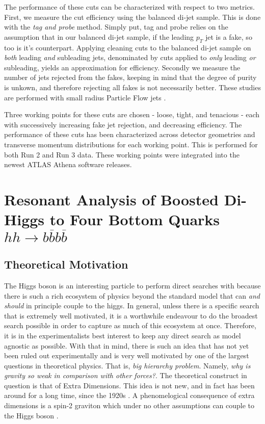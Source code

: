 \documentclass[12pt]{article}
\begin{document}
The performance of these cuts can be characterized with respect to two metrics.
First, we measure the cut efficiency using the balanced di-jet sample. This is
done with the \textit{tag and probe} method. Simply put, tag and probe relies on
the assumption that in our balanced di-jet sample, if the leading $p_T$ jet is a
fake, so too is it's counterpart. Applying cleaning cuts to the balanced di-jet
sample on \textit{both} leading \textit{and} subleading jets, denominated by
cuts applied to \textit{only} leading \textit{or} subleading, yields an
approximation for efficiency. Secondly we measure the number of jets rejected
from the fakes, keeping in mind that the degree of purity is unkown, and
therefore rejecting all fakes is not necessarily better. These studies are
performed with small radius Particle Flow jets \cite{pflow_jets}. 

Three working points for these cuts are chosen - loose, tight, and tenacious -
each with successively increasing fake jet rejection, and decreasing efficiency.
The performance of these cuts has been characterized across detector geometries
and transverse momentum distributions for each working point. This is performed
for both Run 2 and Run 3 data. These working points were integrated into the
newest ATLAS Athena software \cite{atlas_simulation} releases.

\section{Resonant Analysis of Boosted Di-Higgs to Four Bottom Quarks
$hh\rightarrow b\overline{b}b\overline{b}$}
\subsection{Theoretical Motivation}

The Higgs boson is an interesting particle to perform direct searches with
because there is such a rich ecosystem of physics beyond the standard model that
can \textit{and should} in principle couple to the higgs. In general, unless
there is a specific search that is extremely well motivated, it is a worthwhile
endeavour to do the broadest search possible in order to capture as much of this
ecosystem at once. Therefore, it is in the experimentalists best interest to
keep any direct search as model agnostic as possible. With that in mind, there
is such an idea that has not yet been ruled out experimentally and is very well
motivated by one of the largest questions in theoretical physics. That is,
\textit{big hierarchy problem}. Namely, \textit{why is gravity so weak in
comparison with other forces?}. The theoretical construct in question is that of
Extra Dimensions. This idea is not new, and in fact has been around for a long
time, since the 1920s \cite{KALUZA_2018}. A phenomelogical consequence of extra
dimensions is a spin-2 graviton which under no other assumptions can couple to
the Higgs boson \cite{bsm}.  
\end{document}
